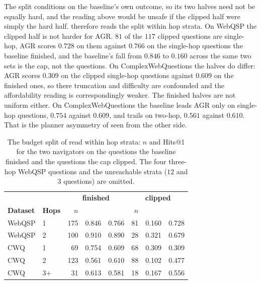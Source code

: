 The split conditions on the baseline's own outcome, so its two halves
need not be equally hard, and the reading above would be unsafe if the
clipped half were simply the hard half.  therefore
reads the split within hop strata. On WebQSP the clipped half is not
harder for AGR. $81$ of the $117$ clipped questions are single-hop, AGR
scores $0.728$ on them against $0.766$ on the single-hop questions the
baseline finished, and the baseline's fall from $0.846$ to $0.160$
across the same two sets is the cap, not the questions. On
ComplexWebQuestions the halves do differ: AGR scores $0.309$ on the
clipped single-hop questions against $0.609$ on the finished ones, so
there truncation and difficulty are confounded and the affordability
reading is correspondingly weaker. The finished halves are not uniform
either. On ComplexWebQuestions the baseline leads AGR only on single-hop
questions, $0.754$ against $0.609$, and trails on two-hop, $0.561$
against $0.610$. That is the planner asymmetry of 
seen from the other side.

\begin{table}[!tb]
  \begin{center}
    \caption{The budget split of  read within hop
      strata: $n$ and Hits@1 for the two navigators on the questions
      the baseline finished and the questions the cap clipped. The four
      three-hop WebQSP questions and the unreachable strata ($12$ and
      $3$ questions) are omitted.}
    \label{tab:togstrata}
    \footnotesize
    \setlength{\tabcolsep}{5pt}
    \begin{tabular}{|ll|rrr|rrr|}
      \hline
      & & \multicolumn{3}{c|}{\textbf{\tog{} finished}}
        & \multicolumn{3}{c|}{\textbf{\tog{} clipped}} \\
      \textbf{Dataset} & \textbf{Hops} & $n$ & \tog{} & \agr{}
        & $n$ & \tog{} & \agr{} \\
      \hline
      WebQSP & 1 & 175 & 0.846 & 0.766 & 81 & 0.160 & 0.728 \\
      WebQSP & 2 & 100 & 0.910 & 0.890 & 28 & 0.321 & 0.679 \\
      \hline
      CWQ & 1 & 69 & 0.754 & 0.609 & 68 & 0.309 & 0.309 \\
      CWQ & 2 & 123 & 0.561 & 0.610 & 88 & 0.102 & 0.477 \\
      CWQ & 3+ & 31 & 0.613 & 0.581 & 18 & 0.167 & 0.556 \\
      \hline
    \end{tabular}
  \end{center}
\end{table}

